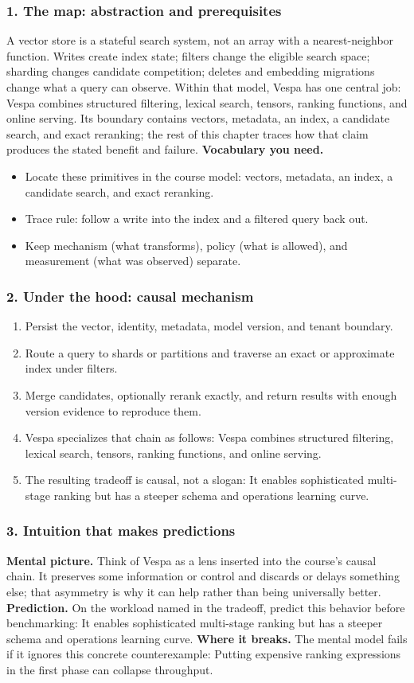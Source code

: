 \subsubsection*{1. The map: abstraction and prerequisites}
A vector store is a stateful search system, not an array with a nearest-neighbor function. Writes create index state; filters change the eligible search space; sharding changes candidate competition; deletes and embedding migrations change what a query can observe.
Within that model, Vespa has one central job: Vespa combines structured filtering, lexical search, tensors, ranking functions, and online serving. Its boundary contains vectors, metadata, an index, a candidate search, and exact reranking; the rest of this chapter traces how that claim produces the stated benefit and failure.
\textbf{Vocabulary you need.}\begin{itemize}
\item Locate these primitives in the course model: vectors, metadata, an index, a candidate search, and exact reranking.
\item Trace rule: follow a write into the index and a filtered query back out.
\item Keep mechanism (what transforms), policy (what is allowed), and measurement (what was observed) separate.
\end{itemize}
\subsubsection*{2. Under the hood: causal mechanism}\begin{enumerate}
\item Persist the vector, identity, metadata, model version, and tenant boundary.
\item Route a query to shards or partitions and traverse an exact or approximate index under filters.
\item Merge candidates, optionally rerank exactly, and return results with enough version evidence to reproduce them.
\item Vespa specializes that chain as follows: Vespa combines structured filtering, lexical search, tensors, ranking functions, and online serving.
\item The resulting tradeoff is causal, not a slogan: It enables sophisticated multi-stage ranking but has a steeper schema and operations learning curve.
\end{enumerate}
\subsubsection*{3. Intuition that makes predictions}
\textbf{Mental picture.} Think of Vespa as a lens inserted into the course's causal chain. It preserves some information or control and discards or delays something else; that asymmetry is why it can help rather than being universally better.
\textbf{Prediction.} On the workload named in the tradeoff, predict this behavior before benchmarking: It enables sophisticated multi-stage ranking but has a steeper schema and operations learning curve.
\textbf{Where it breaks.} The mental model fails if it ignores this concrete counterexample: Putting expensive ranking expressions in the first phase can collapse throughput.
